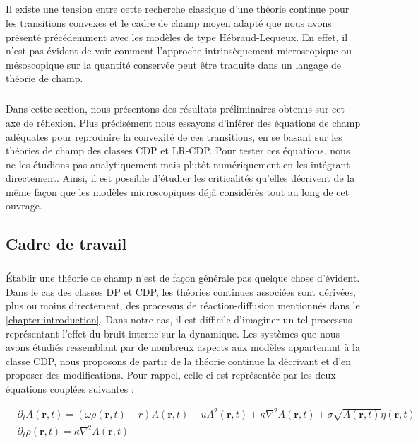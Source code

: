 \subparagraph{}Il existe une tension entre cette recherche classique d'une théorie continue pour les transitions convexes et le cadre de champ moyen adapté que nous avons présenté précédemment avec les modèles de type Hébraud-Lequeux. En effet, il n'est pas évident de voir comment l'approche intrinsèquement microscopique ou mésoscopique sur la quantité conservée peut être traduite dans un langage de théorie de champ.

\subparagraph{}Dans cette section, nous présentons des résultats préliminaires obtenus sur cet axe de réflexion. Plus précisément nous essayons d'inférer des équations de champ adéquates pour reproduire la convexité de ces transitions, en se basant sur les théories de champ des classes CDP et LR-CDP. Pour tester ces équations, nous ne les étudions pas analytiquement mais plutôt numériquement en les intégrant directement. Ainsi, il est possible d'étudier les criticalités qu'elles décrivent de la même façon que les modèles microscopiques déjà considérés tout au long de cet ouvrage.

\subsection{Cadre de travail}

\subparagraph{}Établir une théorie de champ n'est de façon générale pas quelque chose d'évident. Dans le cas des classes DP et CDP, les théories continues associées sont dérivées, plus ou moins directement, des processus de réaction-diffusion mentionnés dans le \autoref{chapter:introduction}. Dans notre cas, il est difficile d'imaginer un tel processus représentant l'effet du bruit interne sur la dynamique. Les systèmes que nous avons étudiés ressemblant par de nombreux aspects aux modèles appartenant à la classe CDP, nous proposons de partir de la théorie continue la décrivant et d'en proposer des modifications. Pour rappel, celle-ci est représentée par les deux équations couplées suivantes :

\begin{equation}
\begin{aligned}
	&\partial_t A(\mathbf{r}, t) = (\omega\rho (\mathbf{r}, t) - r)A(\mathbf{r}, t) - uA^2(\mathbf{r}, t) + \kappa\nabla^2 A (\mathbf{r}, t) + \sigma \sqrt{A(\mathbf{r}, t)} \eta(\mathbf{r}, t)\\
	&\partial_t \rho (\mathbf{r}, t) = \kappa\nabla^2 A (\mathbf{r}, t)
\end{aligned}
\label{eq:CDP2}
\end{equation}

